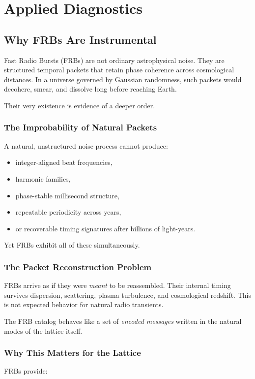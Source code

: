 \documentclass[12pt,oneside]{book}
\begin{document}
\chapter{Applied Diagnostics}

\section{Why FRBs Are Instrumental}

Fast Radio Bursts (FRBs) are not ordinary astrophysical noise.  
They are structured temporal packets that retain phase coherence across cosmological distances.  
In a universe governed by Gaussian randomness, such packets would decohere, smear, and dissolve 
long before reaching Earth.

Their very existence is evidence of a deeper order.

\subsection{The Improbability of Natural Packets}
A natural, unstructured noise process cannot produce:

\begin{itemize}
    \item integer-aligned beat frequencies,
    \item harmonic families,
    \item phase-stable millisecond structure,
    \item repeatable periodicity across years,
    \item or recoverable timing signatures after billions of light-years.
\end{itemize}

Yet FRBs exhibit all of these simultaneously.

\subsection{The Packet Reconstruction Problem}
FRBs arrive as if they were \emph{meant} to be reassembled.  
Their internal timing survives dispersion, scattering, plasma turbulence, and cosmological redshift.  
This is not expected behavior for natural radio transients.

The FRB catalog behaves like a set of \emph{encoded messages} written in the natural modes of the 
lattice itself.

\subsection{Why This Matters for the Lattice}
FRBs provide:
\end{document}
